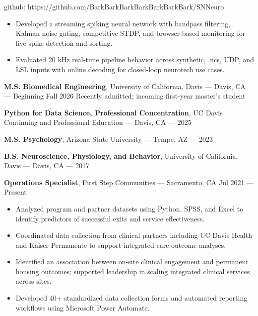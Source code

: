 \documentclass[11pt]{article}
\providecommand{\tightlist}{\setlength{\itemsep}{0pt}\setlength{\parskip}{0pt}}
\renewcommand{\subsection}[1]{\par\medskip\noindent{\sffamily\bfseries\fontsize{11pt}{0}\selectfont #1}\par\smallskip}
\begin{document}
github: https://github.com/BarkBarkBarkBarkBarkBarkBark/SNNeuro

\begin{itemize}
\tightlist
\item
  Developed a streaming spiking neural network with bandpass filtering,
  Kalman noise gating, competitive STDP, and browser-based monitoring
  for live spike detection and sorting.
\item
  Evaluated 20 kHz real-time pipeline behavior across synthetic, .ncs,
  UDP, and LSL inputs with online decoding for closed-loop neurotech use
  cases.
\end{itemize}

\subsection{Education}\label{education}

\textbf{M.S. Biomedical Engineering}, University of California, Davis
--- Davis, CA --- Beginning Fall 2026 Recently admitted; incoming
first-year master's student

\textbf{Python for Data Science, Professional Concentration}, UC Davis
Continuing and Professional Education --- Davis, CA --- 2025

\textbf{M.S. Psychology}, Arizona State University --- Tempe, AZ ---
2023

\textbf{B.S. Neuroscience, Physiology, and Behavior}, University of
California, Davis --- Davis, CA --- 2017

\subsection{Professional Experience}\label{professional-experience}

\textbf{Operations Specialist}, First Step Communities --- Sacramento,
CA Jul 2021 --- Present

\begin{itemize}
\tightlist
\item
  Analyzed program and partner datasets using Python, SPSS, and Excel to
  identify predictors of successful exits and service effectiveness.
\item
  Coordinated data collection from clinical partners including UC Davis
  Health and Kaiser Permanente to support integrated care outcome
  analyses.
\item
  Identified an association between on-site clinical engagement and
  permanent housing outcomes; supported leadership in scaling integrated
  clinical services across sites.
\item
  Developed 40+ standardized data collection forms and automated
  reporting workflows using Microsoft Power Automate.
\end{itemize}
\end{document}
